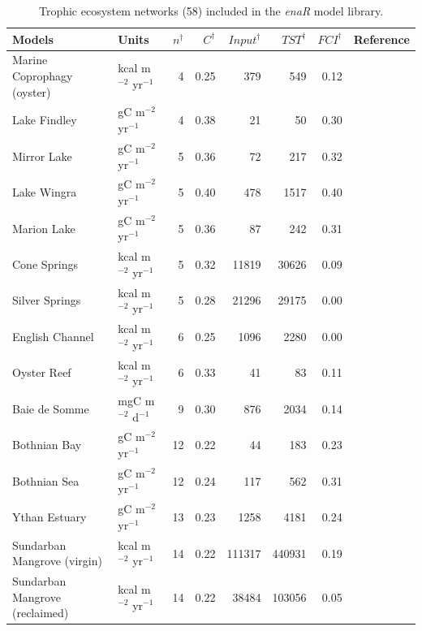 \documentclass[article]{jss}
\begin{document}
\begin{table}[ht]
\begin{center}
  \caption{Trophic ecosystem networks (58) included in the
    \textit{enaR} model library.} \label{tab:TRO}
  \begin{tiny}
    \begin{tabular}{llrrrrrr}
      \hline
      Models & Units & $n^\dagger$ & $C^\dagger$ & $Input^\dagger$ & $TST^\dagger$ & $FCI^\dagger$ & Reference \\
      \hline
      Marine Coprophagy (oyster) & kcal m$^{-2}$ yr$^{-1}$  &   4 & 0.25 & 379 & 549 & 0.12 & \citet{haven66} \\
      Lake Findley  & gC m$^{-2}$ yr$^{-1}$  &   4 & 0.38 &  21 &  50 & 0.30 &  \citet{richey78} \\
      Mirror Lake & gC m$^{-2}$ yr$^{-1}$  &   5 & 0.36 &  72 & 217 & 0.32 &   \citet{richey78} \\
      Lake Wingra & gC m$^{-2}$ yr$^{-1}$  &   5 & 0.40 & 478 & 1517 & 0.40 &  \citet{richey78} \\
      Marion Lake & gC m$^{-2}$ yr$^{-1}$  &   5 & 0.36 &  87 & 242 & 0.31 &  \citet{richey78} \\
      Cone Springs & kcal m$^{-2}$ yr$^{-1}$  &   5 & 0.32 & 11819 & 30626 & 0.09 &  \citet{tilly68} \\
      Silver Springs & kcal m$^{-2}$ yr$^{-1}$  &   5 & 0.28 & 21296 & 29175 & 0.00 &  \citet{odum57} \\
      English Channel & kcal m$^{-2}$ yr$^{-1}$  &   6 & 0.25 & 1096 & 2280 & 0.00 &  \citet{brylinsky72} \\
      Oyster Reef  & kcal m$^{-2}$ yr$^{-1}$  &   6 & 0.33 &  41 &  83 & 0.11 &  \citet{dame81} \\
      Baie de Somme & mgC m$^{-2}$ d$^{-1}$  &   9 & 0.30 & 876 & 2034 & 0.14 &  \citet{rybarczyk03} \\
      Bothnian Bay & gC m$^{-2}$ yr$^{-1}$  &  12 & 0.22 &  44 & 183 & 0.23 &   \citet{sandberg00} \\
      Bothnian Sea & gC m$^{-2}$ yr$^{-1}$  &  12 & 0.24 & 117 & 562 & 0.31 &   \citet{sandberg00} \\
      Ythan Estuary & gC m$^{-2}$ yr$^{-1}$  &  13 & 0.23 & 1258 & 4181 & 0.24 &  \citet{baird81} \\
      Sundarban Mangrove (virgin) & kcal m$^{-2}$ yr$^{-1}$  &  14 & 0.22 & 111317 & 440931 & 0.19 & \citet{ray08} \\
      Sundarban Mangrove (reclaimed) & kcal m$^{-2}$ yr$^{-1}$  &  14 & 0.22 & 38484 & 103056 & 0.05 & \citet{ray08} \\

\end{tabular}
\end{tiny}
\end{center}
\end{table}
\end{document}
